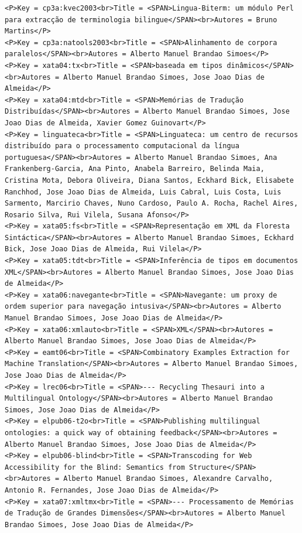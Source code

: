 \documentclass[11pt,a4paper]{report}
\begin{document}
\begin{appendices}
\begin{lstlisting}
<P>Key = cp3a:kvec2003<br>Title = <SPAN>Lingua-Biterm: um módulo Perl para extracção de terminologia bilingue</SPAN><br>Autores = Bruno Martins</P>
<P>Key = cp3a:natools2003<br>Title = <SPAN>Alinhamento de corpora paralelos</SPAN><br>Autores = Alberto Manuel Brandao Simoes</P>
<P>Key = xata04:tx<br>Title = <SPAN>baseada em tipos dinâmicos</SPAN><br>Autores = Alberto Manuel Brandao Simoes, Jose Joao Dias de Almeida</P>
<P>Key = xata04:mtd<br>Title = <SPAN>Memórias de Tradução Distribuídas</SPAN><br>Autores = Alberto Manuel Brandao Simoes, Jose Joao Dias de Almeida, Xavier Gomez Guinovart</P>
<P>Key = linguateca<br>Title = <SPAN>Linguateca: um centro de recursos distribuído para o processamento computacional da língua portuguesa</SPAN><br>Autores = Alberto Manuel Brandao Simoes, Ana Frankenberg-Garcia, Ana Pinto, Anabela Barreiro, Belinda Maia, Cristina Mota, Debora Oliveira, Diana Santos, Eckhard Bick, Elisabete Ranchhod, Jose Joao Dias de Almeida, Luis Cabral, Luis Costa, Luis Sarmento, Marcirio Chaves, Nuno Cardoso, Paulo A. Rocha, Rachel Aires, Rosario Silva, Rui Vilela, Susana Afonso</P>
<P>Key = xata05:fs<br>Title = <SPAN>Representação em XML da Floresta Sintáctica</SPAN><br>Autores = Alberto Manuel Brandao Simoes, Eckhard Bick, Jose Joao Dias de Almeida, Rui Vilela</P>
<P>Key = xata05:tdt<br>Title = <SPAN>Inferência de tipos em documentos XML</SPAN><br>Autores = Alberto Manuel Brandao Simoes, Jose Joao Dias de Almeida</P>
<P>Key = xata06:navegante<br>Title = <SPAN>Navegante: um proxy de ordem superior para navegação intusiva</SPAN><br>Autores = Alberto Manuel Brandao Simoes, Jose Joao Dias de Almeida</P>
<P>Key = xata06:xmlauto<br>Title = <SPAN>XML</SPAN><br>Autores = Alberto Manuel Brandao Simoes, Jose Joao Dias de Almeida</P>
<P>Key = eamt06<br>Title = <SPAN>Combinatory Examples Extraction for Machine Translation</SPAN><br>Autores = Alberto Manuel Brandao Simoes, Jose Joao Dias de Almeida</P>
<P>Key = lrec06<br>Title = <SPAN>--- Recycling Thesauri into a Multilingual Ontology</SPAN><br>Autores = Alberto Manuel Brandao Simoes, Jose Joao Dias de Almeida</P>
<P>Key = elpub06-t2o<br>Title = <SPAN>Publishing multilingual ontologies: a quick way of obtaining feedback</SPAN><br>Autores = Alberto Manuel Brandao Simoes, Jose Joao Dias de Almeida</P>
<P>Key = elpub06-blind<br>Title = <SPAN>Transcoding for Web Accessibility for the Blind: Semantics from Structure</SPAN><br>Autores = Alberto Manuel Brandao Simoes, Alexandre Carvalho, Antonio R. Fernandes, Jose Joao Dias de Almeida</P>
<P>Key = xata07:xmltmx<br>Title = <SPAN>--- Processamento de Memórias de Tradução de Grandes Dimensões</SPAN><br>Autores = Alberto Manuel Brandao Simoes, Jose Joao Dias de Almeida</P>

\end{lstlisting}
\end{appendices}
\end{document}
